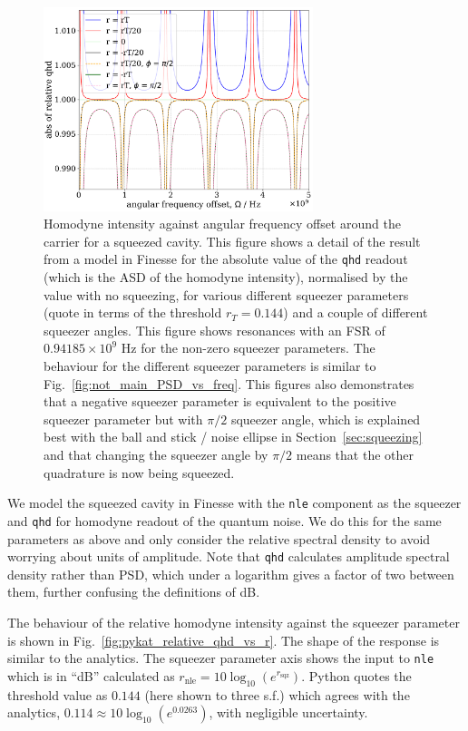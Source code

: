 \documentclass[aps,pra,superscriptaddress,reprint,nofootinbib]{revtex4-1}
\newcommand{\code}[1]{\texttt{#1}}
\begin{document}
\begin{figure}
	\begin{center}
	\includegraphics[width=0.7\textwidth]{figures/pykat_relative_qhd_vs_freq.pdf}
	\end{center}
	\caption{Homodyne intensity against angular frequency offset around the carrier for a squeezed cavity. This figure shows a detail of the result from a model in Finesse for the absolute value of the \code{qhd} readout (which is the ASD of the homodyne intensity), normalised by the value with no squeezing, for various different squeezer parameters (quote in terms of the threshold $r_T = 0.144$) and a couple of different squeezer angles. This figure shows resonances with an FSR of $0.94185 \times 10^9$ Hz for the non-zero squeezer parameters. The behaviour for the different squeezer parameters is similar to Fig.~\ref{fig:not_main_PSD_vs_freq}. This figures also demonstrates that a negative squeezer parameter is equivalent to the positive squeezer parameter but with $\pi/2$ squeezer angle, which is explained best with the ball and stick / noise ellipse in Section~\ref{sec:squeezing} and that changing the squeezer angle by $\pi/2$ means that the other quadrature is now being squeezed.}
	\label{fig:pykat_relative_qhd_vs_freq}
\end{figure}

We model the squeezed cavity in Finesse with the \code{nle} component as the squeezer and \code{qhd} for homodyne readout of the quantum noise. We do this for the same parameters as above and only consider the relative spectral density to avoid worrying about units of amplitude. Note that \code{qhd} calculates amplitude spectral density rather than PSD, which under a logarithm gives a factor of two between them, further confusing the definitions of dB.


The behaviour of the relative homodyne intensity against the squeezer parameter is shown in Fig.~\ref{fig:pykat_relative_qhd_vs_r}. The shape of the response is similar to the analytics. The squeezer parameter axis shows the input to \code{nle} which is in ``dB'' calculated as $r_{\mathrm{nle}} = 10 \log_{10}(e^{r_\mathrm{sqz}})$. Python quotes the threshold value as $0.144$ (here shown to three s.f.) which agrees with the analytics, $0.114 \approx 10 \log_{10}(e^{0.0263})$, with negligible uncertainty.
\end{document}
